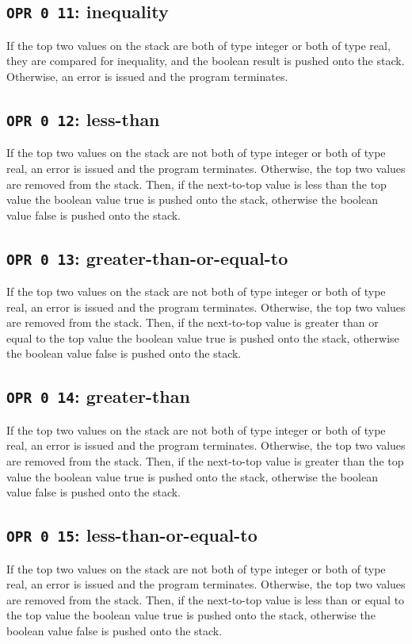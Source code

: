 \documentclass[a4paper,10pt]{report}
\begin{document}
\subsection{\texttt{OPR 0 11}: inequality}
If the top two values on the stack are both of type integer or both of
type real, they are compared for inequality, and the boolean result is
pushed onto the stack.  Otherwise, an error is issued and the program
terminates.

\subsection{\texttt{OPR 0 12}: less-than}
If the top two values on the stack are not both of type integer or
both of type real, an error is issued and the program terminates.
Otherwise, the top two values are removed from the stack.  Then, if
the next-to-top value is less than the top value the boolean value
true is pushed onto the stack, otherwise the boolean value false is
pushed onto the stack.

\subsection{\texttt{OPR 0 13}: greater-than-or-equal-to}
If the top two values on the stack are not both of type integer or
both of type real, an error is issued and the program terminates.
Otherwise, the top two values are removed from the stack.  Then, if
the next-to-top value is greater than or equal to the top value the
boolean value true is pushed onto the stack, otherwise the boolean
value false is pushed onto the stack.

\subsection{\texttt{OPR 0 14}: greater-than}
If the top two values on the stack are not both of type integer or
both of type real, an error is issued and the program terminates.
Otherwise, the top two values are removed from the stack.  Then, if
the next-to-top value is greater than the top value the boolean value
true is pushed onto the stack, otherwise the boolean value false is
pushed onto the stack.

\subsection{\texttt{OPR 0 15}: less-than-or-equal-to}
If the top two values on the stack are not both of type integer or
both of type real, an error is issued and the program terminates.
Otherwise, the top two values are removed from the stack.  Then, if
the next-to-top value is less than or equal to the top value the
boolean value true is pushed onto the stack, otherwise the boolean
value false is pushed onto the stack.
\end{document}
